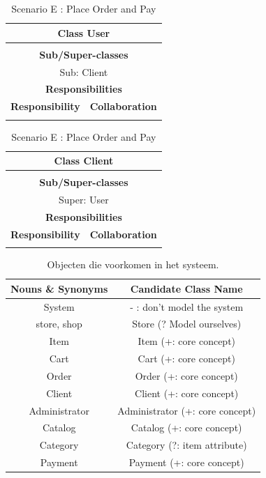 \documentclass[•]{article}
\begin{document}
\begin{table}
\begin{tabular}{|l||l|}
\hline
\multicolumn{2}{|c|}{ Class \textbf{User} }\\ \hline
\multicolumn{2}{|c|}{}\\ \hline
\multicolumn{2}{|c|}{ \textbf{Sub/Super-classes} }\\ \hline
\multicolumn{2}{|c|}{Sub: Client} \\ \hline
\multicolumn{2}{|c|}{ \textbf{Responsibilities}}\\ \hline
\textbf{Responsibility} & \textbf{Collaboration} \\ \hline
 &  \\ \hline
\end{tabular}
\begin{tabular}{|l||l|}
\hline
\multicolumn{2}{|c|}{ Class \textbf{Client} }\\ \hline
\multicolumn{2}{|c|}{}\\ \hline
\multicolumn{2}{|c|}{ \textbf{Sub/Super-classes} }\\ \hline
\multicolumn{2}{|c|}{Super: User} \\ \hline
\multicolumn{2}{|c|}{ \textbf{Responsibilities}}\\ \hline
\textbf{Responsibility} & \textbf{Collaboration} \\ \hline
 & \\ \hline
\end{tabular}
\caption{Scenario E : Place Order and Pay}
\label{scenarioE}
\end{table}

\begin{table}
\centering
\begin{tabular}{|c|c|}
\hline
Nouns \& Synonyms & Candidate Class Name \\
\hline
System & - : don’t model the system \\
store, shop & Store (? Model ourselves)\\
Item & Item (+: core concept)\\
Cart & Cart (+: core concept)\\
Order & Order (+: core concept)\\
Client & Client (+: core concept)\\
Administrator & Administrator (+: core concept)\\
Catalog & Catalog (+: core concept)\\
Category & Category (?: item attribute)\\
Payment & Payment (+: core concept)\\
\hline
\end{tabular}
\caption{Objecten die voorkomen in het systeem.}
\label{ObjectInSystem}
\end{table}
\end{document}
